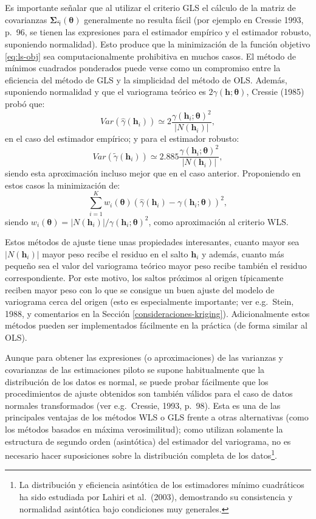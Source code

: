 \documentclass[
]{book}
\theoremstyle{break}
\theoremstyle{definition}
\theoremstyle{definition}
\theoremstyle{definition}
\theoremstyle{definition}
\theoremstyle{remark}
\begin{document}
Es importante señalar que al utilizar el criterio GLS el cálculo de la matriz de covarianzas \(\boldsymbol{\Sigma}_{\hat{\boldsymbol{\gamma}}} (\boldsymbol{\theta})\) generalmente no resulta fácil (por ejemplo en Cressie 1993, p.~96, se tienen las expresiones para el estimador empírico y el estimador robusto, suponiendo normalidad).
Esto produce que la minimización de la función objetivo \eqref{eq:ls-obj} sea computacionalmente prohibitiva en muchos casos.
El método de mínimos cuadrados ponderados puede verse como un compromiso entre la eficiencia del método de GLS y la simplicidad del método de OLS.
Además, suponiendo normalidad y que el variograma teórico es \(2\gamma(\mathbf{h};\boldsymbol{\theta})\), Cressie (1985) probó que:
\[Var(\hat{\gamma}(\mathbf{h}_{i}))\simeq 2\dfrac{\gamma(\mathbf{h}_{i}
;\boldsymbol{\theta})^2 }{\left| N(\mathbf{h}_{i})\right| },\]
en el caso del estimador empírico; y para el estimador robusto:
\[Var(\tilde{\gamma}(\mathbf{h}_{i}))\simeq 2.885\dfrac{\gamma
(\mathbf{h}_{i} ;\boldsymbol{\theta})^2 }{\left| N(\mathbf{h}_{i})\right| },\]
siendo esta aproximación incluso mejor que en el caso anterior.
Proponiendo en estos casos la minimización de:
\[\sum\limits_{i=1}^{K} w_{i}(\boldsymbol{\theta}) \left( \hat{\gamma}(\mathbf{h}_{i}) - \gamma(\mathbf{h}_{i};\boldsymbol{\theta}) \right)^2,\]
siendo \(w_{i}(\boldsymbol{\theta}) = \left| N(\mathbf{h}_{i})\right| /\gamma(\mathbf{h}_{i} ;\boldsymbol{\theta})^2\), como aproximación al criterio WLS.

Estos métodos de ajuste tiene unas propiedades interesantes, cuanto mayor sea \(\left| N(\mathbf{h}_{i})\right|\) mayor peso recibe el residuo en el salto \(\mathbf{h}_{i}\) y además, cuanto más pequeño sea el valor del variograma teórico mayor peso recibe también el residuo correspondiente.
Por este motivo, los saltos próximos al origen típicamente reciben mayor peso con lo que se consigue un buen ajuste del modelo de variograma cerca del origen (esto es especialmente importante; ver e.g.~Stein, 1988, y comentarios en la Sección \ref{consideraciones-kriging}).
Adicionalmente estos métodos pueden ser implementados fácilmente en la práctica (de forma similar al OLS).

Aunque para obtener las expresiones (o aproximaciones) de las varianzas y covarianzas de las estimaciones piloto se supone habitualmente que la distribución de los datos es normal, se puede probar fácilmente que los procedimientos de ajuste obtenidos son también válidos para el caso de datos normales transformados (ver e.g.~Cressie, 1993, p.~98).
Esta es una de las principales ventajas de los métodos WLS o GLS frente a otras alternativas (como los métodos basados en máxima verosimilitud); como utilizan solamente la estructura de segundo orden (asintótica) del estimador del variograma, no es necesario hacer suposiciones sobre la distribución completa de los datos\footnote{La distribución y eficiencia asintótica de los estimadores mínimo cuadráticos ha sido estudiada por Lahiri et al.~(2003), demostrando su consistencia y normalidad asintótica bajo condiciones muy generales.}.
\end{document}

